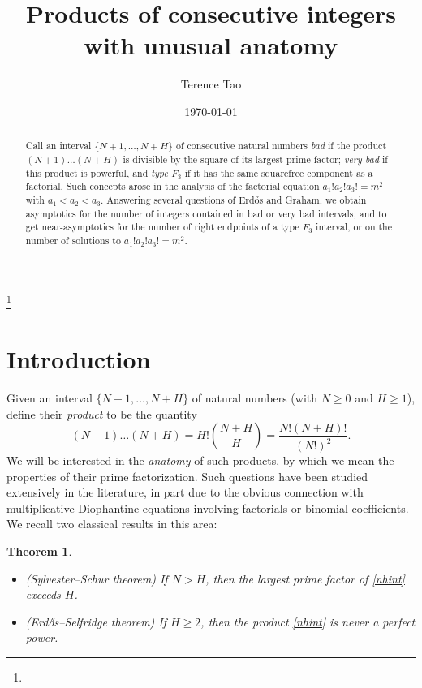\documentclass[12pt]{amsart}
\newtheorem{theorem}{Theorem}[section]
\begin{document}

\title{Products of consecutive integers with unusual anatomy}

\author[Tao]{Terence Tao}
\address{Department of Mathematics, UCLA, 405 Hilgard Ave, Los Angeles CA 90024}



\keywords{}
\thanks{}


\date{\today}

\begin{abstract} Call an interval $\{N+1,\dots,N+H\}$ of consecutive natural numbers \emph{bad} if the product $(N+1) \dots (N+H)$ is divisible by the square of its largest prime factor; \emph{very bad} if this product is powerful, and \emph{type $F_3$} if it has the same squarefree component as a factorial.  Such concepts arose in the analysis of the factorial equation $a_1! a_2! a_3! = m^2$ with $a_1<a_2<a_3$.  Answering several questions of Erd\H{o}s and Graham, we obtain asymptotics for the number of integers contained in bad or very bad intervals, and to get near-asymptotics for the number of right endpoints of a type $F_3$ interval, or on the number of solutions to $a_1! a_2! a_3! = m^2$.
\end{abstract}

\maketitle

\section{Introduction} \label{intro}

Given an interval $\{N+1,\dots,N+H\}$ of natural numbers (with $N \geq 0$ and $H \geq 1$), define their \emph{product} to be the quantity
\begin{equation}\label{nhint}
 (N+1) \dots (N+H) = H! \binom{N+H}{H} = \frac{N! (N+H)!}{(N!)^2}.
 \end{equation}
We will be interested in the \emph{anatomy} of such products, by which we mean the properties of their prime factorization.  Such questions have been studied extensively in the literature, in part due to the obvious connection with multiplicative Diophantine equations involving factorials or binomial coefficients.  We recall two classical results in this area:

\begin{theorem}\label{classical}\
    \begin{itemize}
        \item[(i)] (Sylvester--Schur theorem) If $N > H$, then the largest prime factor of \eqref{nhint} exceeds $H$.
        \item[(ii)] (Erd\H{o}s--Selfridge theorem) If $H \geq 2$, then the product \eqref{nhint} is never a perfect power.
    \end{itemize}
\end{theorem}
\end{document}
